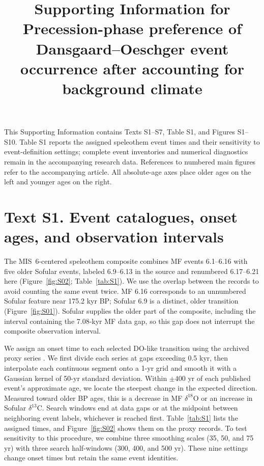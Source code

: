 \documentclass[11pt]{article}
\title{Supporting Information for\\Precession-phase preference of Dansgaard--Oeschger event occurrence after accounting for background climate}
\author{}
\date{}
\begin{document}
\maketitle
\linenumbers
\noindent This Supporting Information contains Texts S1--S7, Table S1, and Figures S1--S10. Table S1 reports the assigned speleothem event times and their sensitivity to event-definition settings; complete event inventories and numerical diagnostics remain in the accompanying research data. References to numbered main figures refer to the accompanying article. All absolute-age axes place older ages on the left and younger ages on the right.

\section*{Text S1. Event catalogues, onset ages, and observation intervals}

The MIS~6-centered speleothem composite combines MF events 6.1--6.16 with five older Sofular events, labeled 6.9--6.13 in the source and renumbered 6.17--6.21 here (Figure~\ref{fig:S02}; Table~\ref{tab:S1}). We use the overlap between the records to avoid counting the same event twice. MF 6.16 corresponds to an unnumbered Sofular feature near 175.2 kyr BP; Sofular 6.9 is a distinct, older transition (Figure~\ref{fig:S01}). Sofular supplies the older part of the composite, including the interval containing the 7.08-kyr MF data gap, so this gap does not interrupt the composite observation interval.

We assign an onset time to each selected DO-like transition using the archived proxy series \citep{fohlmeister2023mfData,held2024sofularData}. We first divide each series at gaps exceeding 0.5 kyr, then interpolate each continuous segment onto a 1-yr grid and smooth it with a Gaussian kernel of 50-yr standard deviation. Within $\pm400$ yr of each published event's approximate age, we locate the steepest change in the expected direction. Measured toward older BP ages, this is a decrease in MF $\delta^{18}$O or an increase in Sofular $\delta^{13}$C. Search windows end at data gaps or at the midpoint between neighboring event labels, whichever is reached first. Table~\ref{tab:S1} lists the assigned times, and Figure~\ref{fig:S02} shows them on the proxy records. To test sensitivity to this procedure, we combine three smoothing scales (35, 50, and 75 yr) with three search half-windows (300, 400, and 500 yr). These nine settings change onset times but retain the same event identities.
\end{document}
